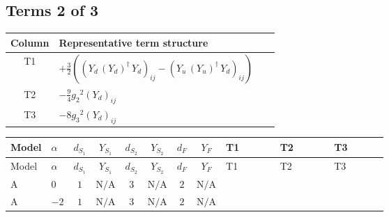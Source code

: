 \documentclass[8pt]{article}
\begin{document}
\begin{landscape}
\subsection*{Terms 2 of 3}
\begin{center}
\begin{tabular}{@{}c >{\raggedright\arraybackslash}p{0.82\linewidth}@{}}
\toprule
Column & Representative term structure \\
\midrule
T1 & \(\displaystyle +\frac{3}{2} (\left({Y_d}\,\left({Y_d}\right)^{\dagger}\,{Y_d}\right)_{ij}-\left({Y_u}\,\left({Y_u}\right)^{\dagger}\,{Y_d}\right)_{ij})\) \\
\midrule
T2 & \(\displaystyle -\frac{9}{4} {g_2}^2 \left({Y_d}\right)_{ij}\) \\
\midrule
T3 & \(\displaystyle -8 {g_3}^2 \left({Y_d}\right)_{ij}\) \\
\midrule
\bottomrule
\end{tabular}
\end{center}
\smallskip
\tiny
\begin{longtable}{@{}llcccccc >{\raggedright\arraybackslash}p{0.21\linewidth} >{\raggedright\arraybackslash}p{0.21\linewidth} >{\raggedright\arraybackslash}p{0.21\linewidth}@{}}
\toprule
Model & $\alpha$ & $d_{S_1}$ & $Y_{S_1}$ & $d_{S_2}$ & $Y_{S_2}$ & $d_F$ & $Y_F$ & T1 & T2 & T3 \\
\midrule
\endfirsthead
\toprule
Model & $\alpha$ & $d_{S_1}$ & $Y_{S_1}$ & $d_{S_2}$ & $Y_{S_2}$ & $d_F$ & $Y_F$ & T1 & T2 & T3 \\
\midrule
\endhead
A & $0$ & $1$ & $\text{N/A}$ & $3$ & $\text{N/A}$ & $2$ & $\text{N/A}$ & \scriptsize\adjustbox{max width=\linewidth}{$\begin{gathered} +\frac{3}{2} (\left({Y_d}\,\left({Y_d}\right)^{\dagger}\,{Y_d}\right)_{ij}-\left({Y_u}\,\left({Y_u}\right)^{\dagger}\,{Y_d}\right)_{ij})\end{gathered}$} & \scriptsize\adjustbox{max width=\linewidth}{$\begin{gathered} -\frac{9}{4} {g_2}^2 \left({Y_d}\right)_{ij}\end{gathered}$} & \scriptsize\adjustbox{max width=\linewidth}{$\begin{gathered} -8 {g_3}^2 \left({Y_d}\right)_{ij}\end{gathered}$} \\
\midrule
A & $-2$ & $1$ & $\text{N/A}$ & $3$ & $\text{N/A}$ & $2$ & $\text{N/A}$ & \scriptsize\adjustbox{max width=\linewidth}{$\begin{gathered} +\frac{3}{2} (\left({Y_d}\,\left({Y_d}\right)^{\dagger}\,{Y_d}\right)_{ij}-\left({Y_u}\,\left({Y_u}\right)^{\dagger}\,{Y_d}\right)_{ij})\end{gathered}$} & \scriptsize\adjustbox{max width=\linewidth}{$\begin{gathered} -\frac{9}{4} {g_2}^2 \left({Y_d}\right)_{ij}\end{gathered}$} & \scriptsize\adjustbox{max width=\linewidth}{$\begin{gathered} -8 {g_3}^2 \left({Y_d}\right)_{ij}\end{gathered}$} \\

\end{longtable}
\end{landscape}
\end{document}
